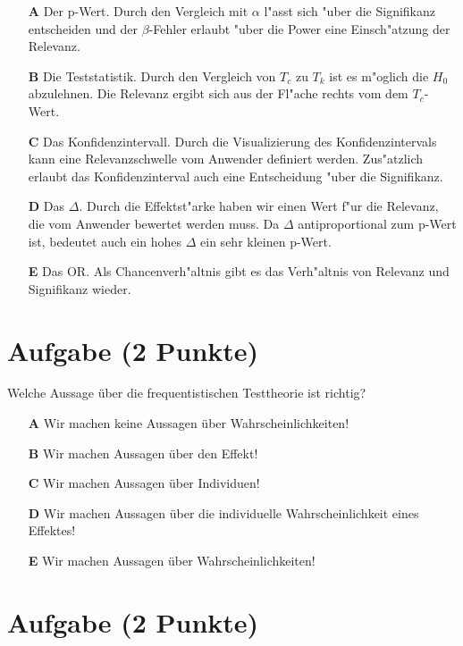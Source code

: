 \documentclass[a4paper, 10pt]{scrartcl}\usepackage[]{graphicx}\usepackage[]{xcolor}
\begin{document}
\begin{enumerate}
\item [\textbf{A} \msquare] Der p-Wert. Durch den Vergleich mit $\alpha$ l{"a}sst sich {"u}ber die Signifikanz entscheiden und der $\beta$-Fehler erlaubt {"u}ber die Power eine Einsch{"a}tzung der Relevanz.
\item [\textbf{B} \msquare] Die Teststatistik. Durch den Vergleich von $T_c$ zu $T_k$ ist es m{"o}glich die $H_0$ abzulehnen. Die Relevanz ergibt sich aus der Fl{"a}che rechts vom dem $T_c$-Wert.
\item [\textbf{C} \msquare] Das Konfidenzintervall. Durch die Visualizierung des Konfidenzintervals kann eine Relevanzschwelle vom Anwender definiert werden. Zus{"a}tzlich erlaubt das Konfidenzinterval auch eine Entscheidung {"u}ber die Signifikanz.
\item [\textbf{D} \msquare] Das $\Delta$. Durch die Effektst{"a}rke haben wir einen Wert f{"u}r die Relevanz, die vom Anwender bewertet werden muss. Da $\Delta$ antiproportional zum p-Wert ist, bedeutet auch ein hohes $\Delta$ ein sehr kleinen p-Wert.
\item [\textbf{E} \msquare] Das OR. Als Chancenverh{"a}ltnis gibt es das Verh{"a}ltnis von Relevanz und Signifikanz wieder.
\end{enumerate}

\section{Aufgabe \hfill (2 Punkte)}



Welche Aussage über die frequentistischen Testtheorie ist richtig?



\begin{enumerate}
\item [\textbf{A} \msquare] Wir machen keine Aussagen über Wahrscheinlichkeiten!
\item [\textbf{B} \msquare] Wir machen Aussagen über den Effekt!
\item [\textbf{C} \msquare] Wir machen Aussagen über Individuen!
\item [\textbf{D} \msquare] Wir machen Aussagen über die individuelle Wahrscheinlichkeit eines Effektes!
\item [\textbf{E} \msquare] Wir machen Aussagen über Wahrscheinlichkeiten!
\end{enumerate}

\section{Aufgabe \hfill (2 Punkte)}
\end{document}
